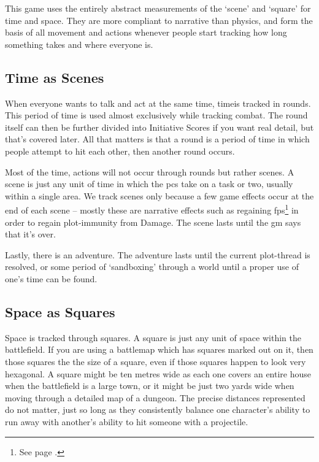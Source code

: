 \begin{multicols}{2}

This game uses the entirely abstract measurements of the `scene' and `square' for time and space. They are more compliant to narrative than physics, and form the basis of all movement and actions whenever people start tracking how long something takes and where everyone is.

\subsection{Time as Scenes}

When everyone wants to talk and act at the same time, timeis tracked in \glspl{round}.
This period of time is used almost exclusively while tracking combat.
The \gls{round} itself can then be further divided into Initiative Scores if you want real detail, but that's covered later.
All that matters is that a \gls{round} is a period of time in which people attempt to hit each other, then another \gls{round} occurs.

Most of the time, actions will not occur through \glspl{round} but rather scenes. A scene is just any unit of time in which the \glspl{pc} take on a task or two, usually within a single area. We track scenes only because a few game effects occur at the end of each scene -- mostly these are narrative effects such as regaining \glspl{fp}\footnote{See page \pageref{fate_points}.} in order to regain plot-immunity from Damage. The scene lasts until the \gls{gm} says that it's over.

Lastly, there is an adventure. The adventure lasts until the current plot-thread is resolved, or some period of `sandboxing' through a world until a proper use of one's time can be found.

\subsection{Space as Squares}

Space is tracked through \glspl{square}. A \gls{square} is just any unit of space within the battlefield. If you are using a battlemap which has squares marked out on it, then those squares the the size of a square, even if those squares happen to look very hexagonal. A square might be ten metres wide as each one covers an entire house when the battlefield is a large town, or it might be just two yards wide when moving through a detailed map of a dungeon. The precise distances represented do not matter, just so long as they consistently balance one character's ability to run away with another's ability to hit someone with a projectile.


\end{multicols}
